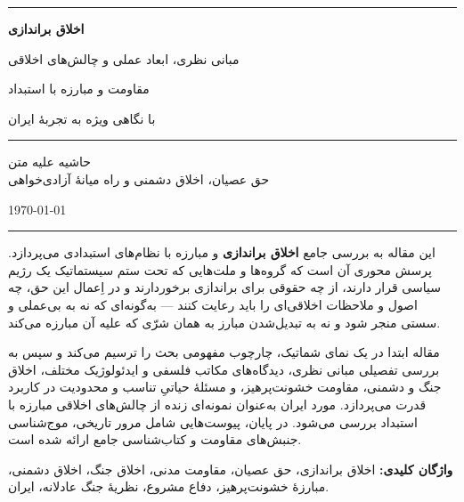 \documentclass[12pt,a4paper]{article}
\newcommand{\concept}[1]{\textbf{\color{PrimaryMid}#1}}
\begin{document}
\begin{titlepage}
\begin{center}
\vspace*{2cm}
{\color{PrimaryDeep}\rule{\linewidth}{2pt}}
\vspace{1cm}

{\Huge\bfseries\color{PrimaryDeep} اخلاق براندازی}

\vspace{0.5cm}

{\Large\color{PrimaryMid} مبانی نظری، ابعاد عملی و چالش‌های اخلاقی}

\vspace{0.3cm}

{\Large\color{AccentTeal} مقاومت و مبارزه با استبداد}

\vspace{0.5cm}

{\large\color{NeutralDark} با نگاهی ویژه به تجربهٔ ایران}

\vspace{1cm}
{\color{AccentGold}\rule{0.5\linewidth}{1pt}}
\vspace{2cm}

{\large\color{TextSecond}
حاشیه علیه متن\\[0.3cm]
حق عصیان، اخلاق دشمنی و راه میانهٔ آزادی‌خواهی
}

\vspace{2cm}

{\normalsize\color{NeutralDark} \today}

\vspace{1cm}
{\color{PrimaryDeep}\rule{\linewidth}{2pt}}
\end{center}
\end{titlepage}

\thispagestyle{empty}
\begin{tcolorbox}[mybox, title=چکیده]
این مقاله به بررسی جامع \concept{اخلاق براندازی} و مبارزه با نظام‌های استبدادی 
می‌پردازد. پرسش محوری آن است که گروه‌ها و ملت‌هایی که تحت ستم سیستماتیک یک رژیم 
سیاسی قرار دارند، از چه حقوقی برای براندازی برخوردارند و در اِعمال این حق، چه 
اصول و ملاحظات اخلاقی‌ای را باید رعایت کنند — به‌گونه‌ای که نه به بی‌عملی و سستی 
منجر شود و نه به تبدیل‌شدن مبارز به همان شرّی که علیه آن مبارزه می‌کند.

مقاله ابتدا در یک نمای شماتیک، چارچوب مفهومی بحث را ترسیم می‌کند و سپس به بررسی 
تفصیلی مبانی نظری، دیدگاه‌های مکاتب فلسفی و ایدئولوژیک مختلف، اخلاق جنگ و دشمنی، 
مقاومت خشونت‌پرهیز، و مسئلهٔ حیاتیِ تناسب و محدودیت در کاربرد قدرت می‌پردازد. 
مورد ایران به‌عنوان نمونه‌ای زنده از چالش‌های اخلاقی مبارزه با استبداد بررسی می‌شود. 
در پایان، پیوست‌هایی شامل مرور تاریخی، موج‌شناسی جنبش‌های مقاومت و کتاب‌شناسی 
جامع ارائه شده است.

\textbf{واژگان کلیدی:} اخلاق براندازی، حق عصیان، مقاومت مدنی، اخلاق جنگ، 
اخلاق دشمنی، مبارزهٔ خشونت‌پرهیز، دفاع مشروع، نظریهٔ جنگ عادلانه، ایران.
\end{tcolorbox}
\end{document}
